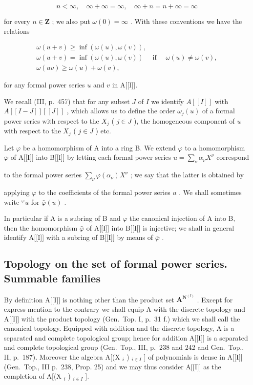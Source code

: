 \[
n <   \infty , \quad \infty + \infty = \infty , \quad \infty + n = n + \infty = \infty
\]

for every \(n \in \mathbf{Z}\) ; we also put \(\omega(0) = \infty\) . With these conventions we have the relations

\[
\begin{array}{c} \omega (u + v) \geqslant \inf (\omega (u), \omega (v)), \\ \omega (u + v) = \inf (\omega (u), \omega (v)) \quad \text { if } \quad \omega (u) \neq \omega (v), \\ \omega (u v) \geqslant \omega (u) + \omega (v), \end{array}
\]

for any formal power series \(u\) and \(v\) in A{[}{[}I{]}{]}.

We recall (III, p.~457) that for any subset \(J\) of \(I\) we identify \(A[[I]]\) with \(A[[I - J]][[J]]\) , which allows us to define the order \(\omega_{j}(u)\) of a formal power series with respect to the \(X_{j}\) ( \(j \in J\) ), the homogeneous component of \(u\) with respect to the \(X_{j}\) ( \(j \in J\) ) etc.

Let \(\varphi\) be a homomorphism of A into a ring B. We extend \(\varphi\) to a homomorphism \(\overline{\varphi}\) of A{[}{[}I{]}{]} into B{[}{[}I{]}{]} by letting each formal power series \(u = \sum_{\nu} \alpha_{\nu} X^{\nu}\) correspond

to the formal power series \(\sum_{\nu} \varphi(\alpha_{\nu}) X^{\nu}\) ; we say that the latter is obtained by

applying \(\varphi\) to the coefficients of the formal power series \(u\) . We shall sometimes write \({}^{\varphi}u\) for \(\bar{\varphi}(u)\) .

In particular if A is a subring of B and \(\varphi\) the canonical injection of A into B, then the homomorphism \(\bar{\varphi}\) of A{[}{[}I{]}{]} into B{[}{[}I{]}{]} is injective; we shall in general identify A{[}{[}I{]}{]} with a subring of B{[}{[}I{]}{]} by means of \(\bar{\varphi}\) .

\subsection{Topology on the set of formal power series. Summable families}

By definition A{[}{[}I{]}{]} is nothing other than the product set \(\mathbf{A}^{\mathbf{N}^{(I)}}\) . Except for express mention to the contrary we shall equip A with the discrete topology and A{[}{[}I{]}{]} with the product topology (Gen.~Top. I, p.~31 f.) which we shall call the canonical topology. Equipped with addition and the discrete topology, A is a separated and complete topological group; hence for addition A{[}{[}I{]}{]} is a separated and complete topological group (Gen.~Top., III, p.~238 and 242 and Gen.~Top., II, p.~187). Moreover the algebra A{[}(X \(_{i}\) ) \(_{i\in I}\) {]} of polynomials is dense in A{[}{[}I{]}{]} (Gen.~Top., III p.~238, Prop. 25) and we may thus consider A{[}{[}I{]}{]} as the completion of A{[}(X \(_{i}\) ) \(_{i\in I}\) {]}.

